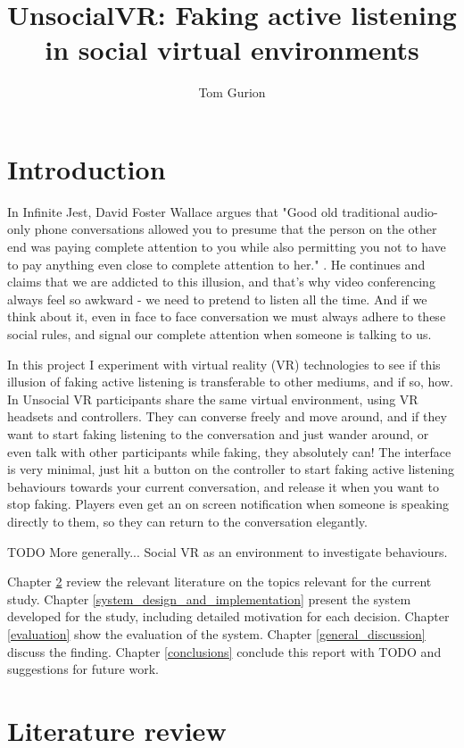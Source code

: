 \documentclass[]{simple-thesis}
\title{UnsocialVR: Faking active listening in social virtual environments}
\author{Tom Gurion}
\affiliation{Media and Arts Technology\\Queen Mary University of London}
\begin{document}
\frontmatter{}  %


\chapter{Introduction}

In Infinite Jest, David Foster Wallace argues that "Good old traditional audio-only phone conversations allowed you to presume that the person on the other end was paying complete attention to you while also permitting you not to have to pay anything even close to complete attention to her." \citep{Wallace1996}.
He continues and claims that we are addicted to this illusion, and that's why video conferencing always feel so awkward - we need to pretend to listen all the time.
And if we think about it, even in face to face conversation we must always adhere to these social rules, and signal our complete attention when someone is talking to us.

In this project I experiment with virtual reality (VR) technologies to see if this illusion of faking active listening is transferable to other mediums, and if so, how.
In Unsocial VR participants share the same virtual environment, using VR headsets and controllers.
They can converse freely and move around, and if they want to start faking listening to the conversation and just wander around, or even talk with other participants while faking, they absolutely can!
The interface is very minimal, just hit a button on the controller to start faking active listening behaviours towards your current conversation, and release it when you want to stop faking.
Players even get an on screen notification when someone is speaking directly to them, so they can return to the conversation elegantly.

TODO More generally...
Social VR as an environment to investigate behaviours.

Chapter \ref{literature_review} review the relevant literature on the topics relevant for the current study.
Chapter \ref{system_design_and_implementation} present the system developed for the study, including detailed motivation for each decision.
Chapter \ref{evaluation} show the evaluation of the system.
Chapter \ref{general_discussion} discuss the finding.
Chapter \ref{conclusions} conclude this report with TODO and suggestions for future work.


\chapter{Literature review}\label{literature_review}
\end{document}
